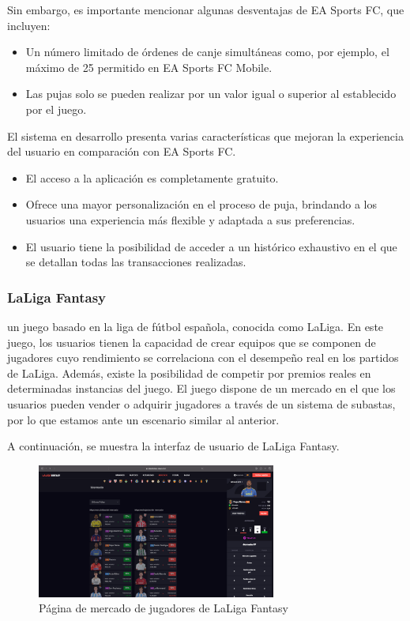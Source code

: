 Sin embargo, es importante mencionar algunas desventajas de EA Sports FC, que incluyen:
\begin{itemize}
    \item Un número limitado de órdenes de canje simultáneas como, por ejemplo, el máximo de 25 permitido en EA Sports FC Mobile.
    \item Las pujas solo se pueden realizar por un valor igual o superior al establecido por el juego. 
\end{itemize}

El sistema en desarrollo presenta varias características que mejoran la experiencia del usuario en comparación con EA Sports FC.

\begin{itemize}
    \item El acceso a la aplicación es completamente gratuito.
    \item Ofrece una mayor personalización en el proceso de puja, brindando a los usuarios una experiencia más flexible y adaptada a sus preferencias.
    \item El usuario tiene la posibilidad de acceder a un histórico exhaustivo en el que se detallan todas las transacciones realizadas.
\end{itemize}

\subsubsection{LaLiga Fantasy}
 un juego basado en la liga de fútbol española, conocida como LaLiga. En este juego, los usuarios tienen la capacidad de crear equipos que se componen de jugadores cuyo rendimiento se correlaciona con el desempeño real en los partidos de LaLiga. Además, existe la posibilidad de competir por premios reales en determinadas instancias del juego.
El juego dispone de un mercado en el que los usuarios pueden vender o adquirir jugadores a través de un sistema de subastas, por lo que estamos ante un escenario similar al anterior.

A continuación, se muestra la interfaz de usuario de LaLiga Fantasy.
\begin{figure}[H]
    \centering
    \includegraphics[width=0.7\textwidth]{figures/4-Estudio-viabilidad/4_LaLigaFantasy.png}
    \caption{Página de mercado de jugadores de LaLiga Fantasy}
    \label{fig:la_liga_fantasy}
    \hypertarget{fig:la_liga_fantasy}{}
\end{figure}

